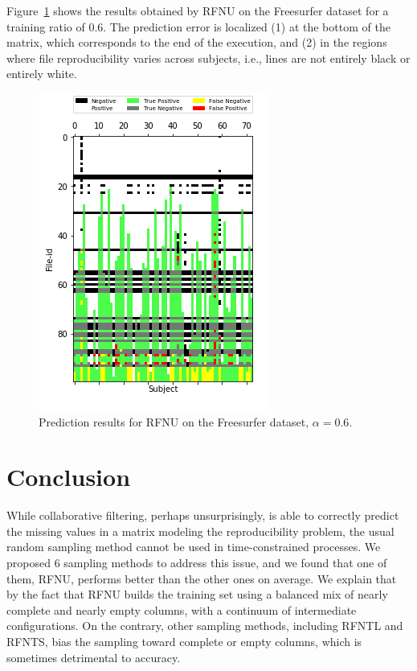 \documentclass[10pt, conference, compsocconf]{IEEEtran}
\begin{document}
Figure~\ref{fig:error-locality} shows the results obtained by RFNU on 
the Freesurfer dataset for a training ratio of 0.6. The prediction 
error is localized (1) at the bottom of the matrix, which corresponds 
to the end of the execution, and (2) in the regions where file 
reproducibility varies across subjects, i.e., lines are not entirely 
black or entirely white.
\begin{figure}
\includegraphics[width=0.6\columnwidth]{figures/RFNU_FS100F_ALS_06_test_data_matrix_run1.png}
\caption{Prediction results for RFNU on the Freesurfer dataset, $\alpha=0.6$.}
\label{fig:error-locality}
\end{figure}

\section{Conclusion}

While collaborative filtering, perhaps unsurprisingly, is able to 
correctly predict the missing values in a matrix modeling the 
reproducibility problem, the usual random sampling method cannot be 
used in time-constrained processes. We proposed 6 sampling methods to 
address this issue, and we found that one of them, RFNU, performs 
better than the other ones on average. We 
explain that by the fact that RFNU builds the training set using a 
balanced mix of nearly complete and nearly empty columns, with a 
continuum of 
intermediate configurations. On the contrary, other sampling 
methods, including RFNTL and RFNTS, bias the sampling toward complete 
or empty columns, which is sometimes detrimental to accuracy.
\end{document}
